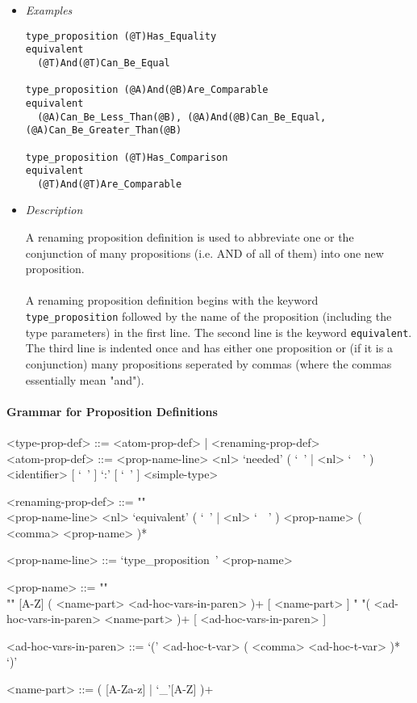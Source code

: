 \documentclass{article}
\begin{document}
\begin{itemize}
\item \textit{Examples}
\begin{verbatim}
type_proposition (@T)Has_Equality
equivalent
  (@T)And(@T)Can_Be_Equal

type_proposition (@A)And(@B)Are_Comparable
equivalent
  (@A)Can_Be_Less_Than(@B), (@A)And(@B)Can_Be_Equal, (@A)Can_Be_Greater_Than(@B)

type_proposition (@T)Has_Comparison
equivalent
  (@T)And(@T)Are_Comparable
\end{verbatim}

\item \textit{Description}

A renaming proposition definition is used to abbreviate one or the conjunction
of many propositions (i.e. AND of all of them) into one new proposition.
\\\\
A renaming proposition definition begins with the keyword
\texttt{type_proposition} followed by the name of the proposition (including
the type parameters) in the first line. The second line is the keyword
\texttt{equivalent}. The third line is indented once and has either one
proposition or (if it is a conjunction) many propositions  seperated by commas
(where the commas essentially mean "and").

\end{itemize}

\paragraph{Grammar for Proposition Definitions}

\begin{grammar}
<type-prop-def> ::= <atom-prop-def> | <renaming-prop-def>
\\

<atom-prop-def> ::=
<prop-name-line> <nl>
`needed' ( `\ ' | <nl> `\ \ ' ) <identifier> [ `\ ' ] `:' [ `\ ' ] <simple-type>

<renaming-prop-def> ::= ""\\
<prop-name-line> <nl>
`equivalent' ( `\ ' | <nl> `\ \ ' ) <prop-name> ( <comma> <prop-name> )*

<prop-name-line> ::= `type_proposition\ ' <prop-name>

<prop-name> ::=  ""\\""
[A-Z] ( <name-part> <ad-hoc-vars-in-paren> )+ [ <name-part> ]
\alt " "( <ad-hoc-vars-in-paren> <name-part> )+ [ <ad-hoc-vars-in-paren> ]

<ad-hoc-vars-in-paren> ::= `(' <ad-hoc-t-var> ( <comma> <ad-hoc-t-var> )* `)'

<name-part> ::= ( [A-Za-z] | `_'[A-Z] )+
\end{grammar} 
\end{document}
